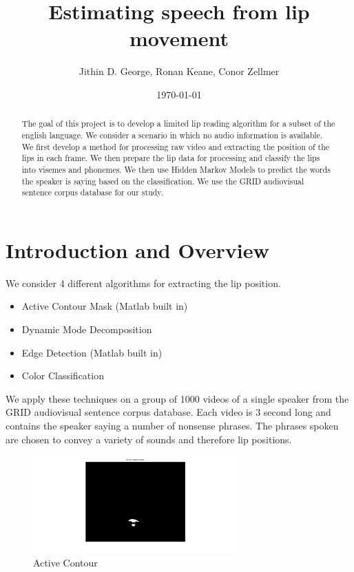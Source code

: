 \documentclass[a4paper]{article}
\title{Estimating speech from lip movement}
\author{Jithin D. George, Ronan Keane, Conor Zellmer}
\date{\today}
\begin{document}
\maketitle

\begin{abstract}
The goal of this project is to develop a limited lip reading algorithm for a subset of the english language. We consider a scenario in which no audio information is available. We first develop a method for processing raw video and extracting the position of the lips in each frame. We then prepare the lip data for processing and classify the lips into visemes and phonemes. We then use Hidden Markov Models to predict the words the speaker is saying based on  the classification. We use the GRID audiovisual sentence corpus database for our study. 
\end{abstract}

\section{Introduction and Overview}
\label{sec:introduction}


We consider 4 different algorithms for extracting the lip position. \begin{itemize}
	\item Active Contour Mask (Matlab built in)
	\item Dynamic Mode Decomposition 
	\item Edge Detection (Matlab built in)
	\item Color Classification
\end{itemize}
We apply these techniques on a group of 1000 videos of a single speaker from the GRID audiovisual sentence corpus database. Each video is 3 second long and contains the speaker saying a number of nonsense phrases. The phrases spoken are chosen to convey a variety of sounds and therefore lip positions.

\begin{figure}[H] 
	\centering
	\includegraphics[width=0.7\textwidth]{active}
	\caption{Active Contour}	
\end{figure}
\end{document}
